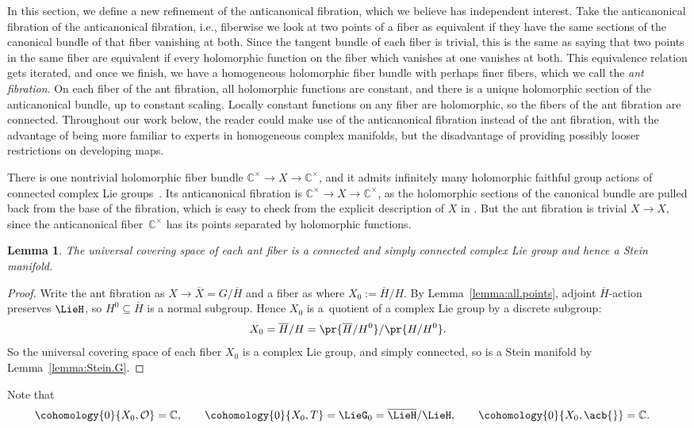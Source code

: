 \documentclass[10pt,a4paper]{amsart}
\providecommand{\C}{}
\numberwithin{equation}{section}
\newtheorem{Lemma}[Theorem]{Lemma}
\renewcommand{\C}{\mathbb{C}}
\newcommand{\OO}{\mathcal{O}}
\newcommand{\GZ}{G_0}
\begin{document}
In this section, we define a new refinement of the anticanonical fibration, which we believe has independent interest.
Take the anticanonical fibration of the anticanonical fibration, i.e., fiberwise we look at two points of a fiber as equivalent if they have the same sections of the canonical bundle of that fiber vanishing at both.
Since the tangent bundle of each fiber is trivial, this is the same as saying that two points in the same fiber are equivalent if every holomorphic function on the fiber which vanishes at one vanishes at both.
This equivalence relation gets iterated, and once we finish, we have a homogeneous holomorphic fiber bundle with perhaps finer fibers, which we call the \emph{ant fibration}.
On each fiber of the ant fibration, all holomorphic functions are constant, and there is a unique holomorphic section of the anticanonical bundle, up to constant scaling.
Locally constant functions on any fiber are holomorphic, so the fibers of the ant fibration are connected.
Throughout our work below, the reader could make use of the anticanonical fibration instead of the ant fibration, with the advantage of being more familiar to experts in homogeneous complex manifolds, but the disadvantage of providing possibly looser restrictions on developing maps.

\begin{Example}
There is one nontrivial holomorphic fiber bundle $\C^{\times} \to X \to \C^{\times}$, and it admits
infinitely many holomorphic faithful group actions of connected complex Lie groups~\cite{McKay:2015}. Its
anticanonical fibration is $\C^{\times} \to X \to \C^{\times}$, as the holomorphic sections of the
canonical bundle are pulled back from the base of the fibration, which is easy to check from the explicit
description of $X$ in \cite{McKay:2015}. But the ant fibration is trivial $X \to X$, since the
anticanonical fiber~$\C^{\times}$ has its points separated by holomorphic functions.
\end{Example}

\begin{Lemma}\label{lemma:ant.Stein}
The universal covering space of each ant fiber is a connected and simply connected complex Lie group and hence a Stein manifold.
\end{Lemma}

\begin{proof}
Write the ant fibration as $X\to \overline{X} = G/\overline{H}$ and a fiber as \pr{X_0,\GZ} where $X_0 := \overline{H}/H$.
By Lemma~\ref{lemma:all.points}, adjoint $\overline{H}$-action preserves $\LieH$, so $H^0 \subseteq \overline{H}$ is a normal subgroup.
Hence $X_0$ is a~quotient of a complex Lie group by a discrete subgroup:
\[
X_0 = \overline{H}/H = \pr{\overline{H}/H^0}/\pr{H/H^0}.
\]
So the universal covering space of each fiber $X_0$ is a complex Lie group, and simply connected, so is a Stein manifold by Lemma~\ref{lemma:Stein.G}.
\end{proof}
Note that
\begin{align*}
&\cohomology{0}{X_0,\OO}=\C,\qquad
\cohomology{0}{X_0,T}=\LieG_0=\overline{\LieH}/\LieH,\qquad
\cohomology{0}{X_0,\acb{}}=\C.
\end{align*}
\end{document}
